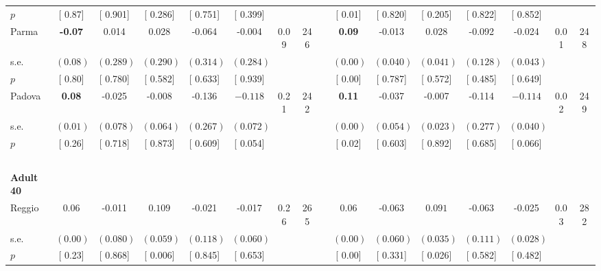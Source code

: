 \begin{longtable}{L{8em} c c c c c c c p{1em} c c c c c c c}
\quad \quad \quad \quad $ p$ & [     0.87] & [    0.901] & [    0.286] & [    0.751] & [    0.399] & & & & [     0.01] & [    0.820] & [    0.205] & [    0.822] & [    0.852] & &  \\[1em]
\quad \quad \quad Parma& \textbf{    -0.07} &     0.014 &     0.028 &    -0.064 &    -0.004 &      0.09 &       246 & & \textbf{     0.09} &    -0.013 &     0.028 &    -0.092 &    -0.024 &      0.01 &       248  \\*
\quad \quad \quad \quad s.e.& $ (     0.08)$ & $ (    0.289)$ & $ (    0.290)$ & $ (    0.314)$ & $ (    0.284)$ & & & & $ (     0.00)$ & $ (    0.040)$ & $ (    0.041)$ & $ (    0.128)$ & $ (    0.043)$ & &  \\*
\quad \quad \quad \quad $ p$ & [     0.80] & [    0.780] & [    0.582] & [    0.633] & [    0.939] & & & & [     0.00] & [    0.787] & [    0.572] & [    0.485] & [    0.649] & &  \\[1em]
\quad \quad \quad Padova& \textbf{     0.08} &    -0.025 &    -0.008 &    -0.136 & $ \mathbf{   -0.118}$ &      0.21 &       242 & & \textbf{     0.11} &    -0.037 &    -0.007 &    -0.114 & $ \mathbf{   -0.114}$ &      0.02 &       249  \\*
\quad \quad \quad \quad s.e.& $ (     0.01)$ & $ (    0.078)$ & $ (    0.064)$ & $ (    0.267)$ & $ (    0.072)$ & & & & $ (     0.00)$ & $ (    0.054)$ & $ (    0.023)$ & $ (    0.277)$ & $ (    0.040)$ & &  \\*
\quad \quad \quad \quad $ p$ & [     0.26] & [    0.718] & [    0.873] & [    0.609] & [    0.054] & & & & [     0.02] & [    0.603] & [    0.892] & [    0.685] & [    0.066] & &  \\[1em]
~\\[1em]
\quad \quad \textbf{Adult 40} & & & & & & & & & & & & & & & \\* 
\quad \quad \quad Reggio& 0.06 &    -0.011 & $ \mathbf{    0.109}$ &    -0.021 &    -0.017 &      0.26 &       265 & & 0.06 &    -0.063 & $ \mathbf{    0.091}$ &    -0.063 &    -0.025 &      0.03 &       282  \\*
\quad \quad \quad \quad s.e.& $ (     0.00)$ & $ (    0.080)$ & $ (    0.059)$ & $ (    0.118)$ & $ (    0.060)$ & & & & $ (     0.00)$ & $ (    0.060)$ & $ (    0.035)$ & $ (    0.111)$ & $ (    0.028)$ & &  \\*
\quad \quad \quad \quad $ p$ & [     0.23] & [    0.868] & [    0.006] & [    0.845] & [    0.653] & & & & [     0.00] & [    0.331] & [    0.026] & [    0.582] & [    0.482] & &  \\[1em]

\end{longtable}

